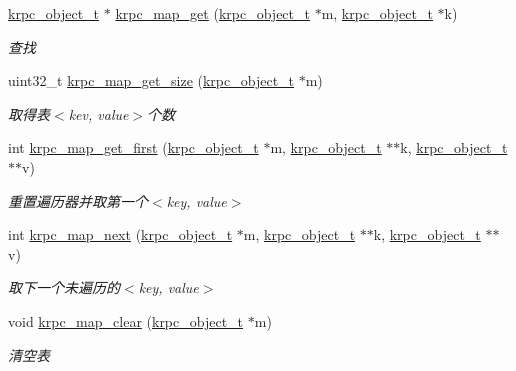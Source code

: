 \begin{DoxyCompactItemize}
\hyperlink{a00056_a9c07dfc8c3b965f75b09f82fdb1bbb1e_a9c07dfc8c3b965f75b09f82fdb1bbb1e}{krpc\+\_\+object\+\_\+t} $\ast$ \hyperlink{a00119_ga87ce3d17030c66e3264fa2e026bfaf33_ga87ce3d17030c66e3264fa2e026bfaf33}{krpc\+\_\+map\+\_\+get} (\hyperlink{a00056_a9c07dfc8c3b965f75b09f82fdb1bbb1e_a9c07dfc8c3b965f75b09f82fdb1bbb1e}{krpc\+\_\+object\+\_\+t} $\ast$m, \hyperlink{a00056_a9c07dfc8c3b965f75b09f82fdb1bbb1e_a9c07dfc8c3b965f75b09f82fdb1bbb1e}{krpc\+\_\+object\+\_\+t} $\ast$k)
\begin{DoxyCompactList}\small\item\em 查找 \end{DoxyCompactList}\item 
uint32\+\_\+t \hyperlink{a00119_gad760f8fec813dab474ac011d7aab1e7e_gad760f8fec813dab474ac011d7aab1e7e}{krpc\+\_\+map\+\_\+get\+\_\+size} (\hyperlink{a00056_a9c07dfc8c3b965f75b09f82fdb1bbb1e_a9c07dfc8c3b965f75b09f82fdb1bbb1e}{krpc\+\_\+object\+\_\+t} $\ast$m)
\begin{DoxyCompactList}\small\item\em 取得表$<$kev, value$>$个数 \end{DoxyCompactList}\item 
int \hyperlink{a00119_gad894af3d72e3ae9629ebd724534dae7f_gad894af3d72e3ae9629ebd724534dae7f}{krpc\+\_\+map\+\_\+get\+\_\+first} (\hyperlink{a00056_a9c07dfc8c3b965f75b09f82fdb1bbb1e_a9c07dfc8c3b965f75b09f82fdb1bbb1e}{krpc\+\_\+object\+\_\+t} $\ast$m, \hyperlink{a00056_a9c07dfc8c3b965f75b09f82fdb1bbb1e_a9c07dfc8c3b965f75b09f82fdb1bbb1e}{krpc\+\_\+object\+\_\+t} $\ast$$\ast$k, \hyperlink{a00056_a9c07dfc8c3b965f75b09f82fdb1bbb1e_a9c07dfc8c3b965f75b09f82fdb1bbb1e}{krpc\+\_\+object\+\_\+t} $\ast$$\ast$v)
\begin{DoxyCompactList}\small\item\em 重置遍历器并取第一个$<$key, value$>$ \end{DoxyCompactList}\item 
int \hyperlink{a00119_gaa818187b224d2ec13b5b1a25badc3fe3_gaa818187b224d2ec13b5b1a25badc3fe3}{krpc\+\_\+map\+\_\+next} (\hyperlink{a00056_a9c07dfc8c3b965f75b09f82fdb1bbb1e_a9c07dfc8c3b965f75b09f82fdb1bbb1e}{krpc\+\_\+object\+\_\+t} $\ast$m, \hyperlink{a00056_a9c07dfc8c3b965f75b09f82fdb1bbb1e_a9c07dfc8c3b965f75b09f82fdb1bbb1e}{krpc\+\_\+object\+\_\+t} $\ast$$\ast$k, \hyperlink{a00056_a9c07dfc8c3b965f75b09f82fdb1bbb1e_a9c07dfc8c3b965f75b09f82fdb1bbb1e}{krpc\+\_\+object\+\_\+t} $\ast$$\ast$v)
\begin{DoxyCompactList}\small\item\em 取下一个未遍历的$<$key, value$>$ \end{DoxyCompactList}\item 
void \hyperlink{a00119_ga76c5ca67a568d6e6634a57c3be742b2c_ga76c5ca67a568d6e6634a57c3be742b2c}{krpc\+\_\+map\+\_\+clear} (\hyperlink{a00056_a9c07dfc8c3b965f75b09f82fdb1bbb1e_a9c07dfc8c3b965f75b09f82fdb1bbb1e}{krpc\+\_\+object\+\_\+t} $\ast$m)
\begin{DoxyCompactList}\small\item\em 清空表 \end{DoxyCompactList}\end{DoxyCompactItemize}



